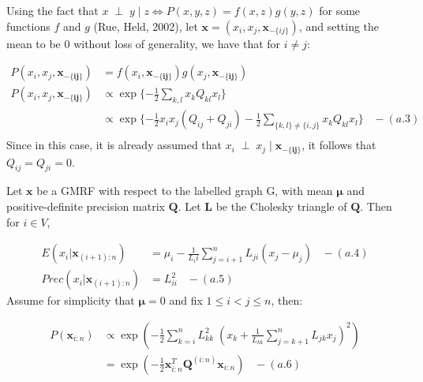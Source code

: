\documentclass[]{article}
\begin{document}
\vspace{1.0cm}

 \newline 

Using the fact that
\(x \; \perp \; y \;|\; z \iff P(x,y,z) = f(x,z) g(y,z)\) for some
functions \(f\) and \(g\) (Rue, Held, 2002), let
\(\mathbf{x} = (x_i, x_j, \mathbf{x}_{-\{ij\}})\), and setting the mean
to be 0 without loss of generality, we have that for \(i \neq j\):

\[
\begin{aligned}
P(x_i, x_j, \mathbf{x_{-\{ij\}}}) &= f(x_i, \mathbf{x_{-\{ij\}}}) g(x_j,\mathbf{x_{-\{ij\}}})\\
P(x_i, x_j, \mathbf{x_{-\{ij\}}}) &\propto \exp\{-\frac{1}{2} \sum_{k,l} x_k Q_{kl} x_l\} \\
&\propto \exp\{-\frac{1}{2}x_i x_j (Q_{ij} + Q_{ji}) -\frac{1}{2}\sum_{\{k,l\} \neq \{i,j\}} x_k Q_{kl} x_l\} \;\;\; - (a.3) \\
\end{aligned}
\] Since in this case, it is already assumed that
\(x_i \; \perp \; x_j \;|\; \mathbf{x_{-\{ij\}}}\), it follows that
\(Q_{ij} = Q_{ji} = 0\). \newline \newline \newline

 \newline 

Let \(\boldsymbol{x}\) be a GMRF with respect to the labelled graph G,
with mean \(\boldsymbol{\mu}\) and positive-definite precision matrix
\(\boldsymbol{Q}\). Let \(\boldsymbol{L}\) be the Cholesky triangle of
\(\boldsymbol{Q}\). Then for \(i \in V\),

\[
\begin{aligned}
E(x_i | \boldsymbol{x}_{(i+1):n}) &= \mu_i − \frac{1}{L_ii} \sum_{j=i+1}^n L_{ji}(x_j − \mu_j) \;\;\; - (a.4)\\ 
Prec(x_i | \boldsymbol{x}_{(i+1):n}) &= L^2_{ii} \;\;\; - (a.5)
\end{aligned}
\] Assume for simplicity that \(\boldsymbol{\mu} = 0\) and fix
\(1 \leq i < j \leq n\), then:

\[
\begin{aligned}
P(\boldsymbol{x}_{i:n}) &\propto \exp \left( -\frac{1}{2} \sum_{k=i}^n L_{kk}^2 \; \left(x_k + \frac{1}{L_{kk}} \sum_{j = k+1}^n L_{jk} x_j\right)^2 \right) \\
&= \exp \left(-\frac{1}{2}\boldsymbol{x}_{i:n}^T \boldsymbol{Q}^{(i:n)} \boldsymbol{x}_{i:n} \right) \;\;\; - (a.6)
\end{aligned}
\]
\end{document}
